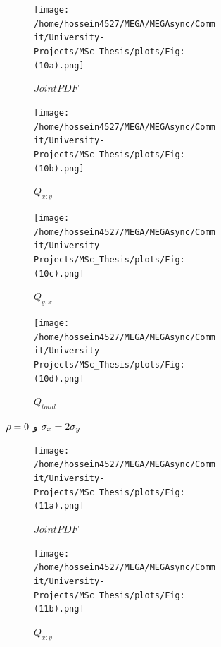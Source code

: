 \documentclass[a4paper,titlepage,12pt,fleqn,oneside]{report}
\begin{document}
 \begin{figure}[tbp]
	\centering
	\begin{subfigure}[b]{\textwidth}
		\renewcommand\thesubfigure{a}
		\begin{subfigure}[b]{0.24\textwidth}
			\renewcommand\thesubfigure{i}
			\centering
			\texttt{[image: /home/hossein4527/MEGA/MEGAsync/Commit/University-Projects/MSc\_Thesis/plots/Fig:(10a).png]}
			\caption{$Joint PDF$}
			\label{fig:3.1.1}
		\end{subfigure}
		\hfill
		\begin{subfigure}[b]{0.24\textwidth}
			\renewcommand\thesubfigure{ii}
			\centering
			\texttt{[image: /home/hossein4527/MEGA/MEGAsync/Commit/University-Projects/MSc\_Thesis/plots/Fig:(10b).png]}
			\caption{$Q_{x:y}$}
			\label{fig:3.1.2}
		\end{subfigure}
		\hfill
		\begin{subfigure}[b]{0.24\textwidth}
			\renewcommand\thesubfigure{iii}
			\centering
			\texttt{[image: /home/hossein4527/MEGA/MEGAsync/Commit/University-Projects/MSc\_Thesis/plots/Fig:(10c).png]}
			\caption{$Q_{y:x}$}
			\label{fig:3.1.3}
		\end{subfigure}
		\hfill
		\begin{subfigure}[b]{0.24\textwidth}
			\renewcommand\thesubfigure{iv}
			\centering
			\texttt{[image: /home/hossein4527/MEGA/MEGAsync/Commit/University-Projects/MSc\_Thesis/plots/Fig:(10d).png]}
			\caption{$Q_{total}$}
			\label{fig:3.1.4}
		\end{subfigure}
		\caption{$\protect\rho =0$ و $\protect\sigma _{x}=2\protect\sigma _{y}$}
		\label{fig:3.1}
	\end{subfigure}
	\begin{subfigure}[b]{\textwidth}
		\renewcommand\thesubfigure{b}
		\begin{subfigure}[b]{0.24\textwidth}
			\renewcommand\thesubfigure{i}
			\centering
			\texttt{[image: /home/hossein4527/MEGA/MEGAsync/Commit/University-Projects/MSc\_Thesis/plots/Fig:(11a).png]}
			\caption{$Joint PDF$}
			\label{fig:3.2.1}
		\end{subfigure}
		\hfill
		\begin{subfigure}[b]{0.24\textwidth}
			\renewcommand\thesubfigure{ii}
			\centering
			\texttt{[image: /home/hossein4527/MEGA/MEGAsync/Commit/University-Projects/MSc\_Thesis/plots/Fig:(11b).png]}
			\caption{$Q_{x:y}$}
			\label{fig:3.2.2}
		\end{subfigure}
		\hfill
		\begin{subfigure}[b]{0.24\textwidth}

\end{subfigure}
\end{subfigure}
\end{figure}
\end{document}
